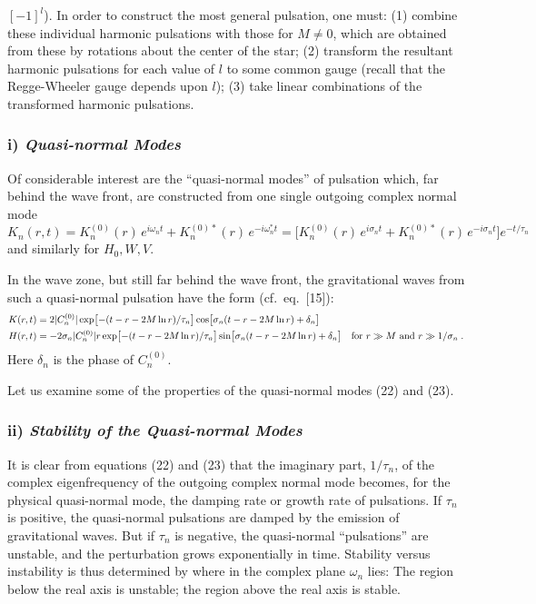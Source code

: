$[-1]^l$). In order to construct the most general pulsation, one must: (1) combine these
individual harmonic pulsations with those for $M \neq 0$, which are obtained from these by
rotations about the center of the star; (2) transform the resultant harmonic pulsations
for each value of $l$ to some common gauge (recall that the Regge-Wheeler gauge depends
upon $l$); (3) take linear combinations of the transformed harmonic pulsations.

\subsubsection*{i) \textit{Quasi-normal Modes}}

Of considerable interest are the ``quasi-normal modes'' of pulsation which, far behind
the wave front, are constructed from one single outgoing complex normal mode
\begin{equation}
  K_n(r,t) = K_n^{(0)}(r)\, e^{i\omega_n t} + K_n^{(0)*}(r)\, e^{-i\omega_n^* t}
  = \bigl[ K_n^{(0)}(r)\, e^{i\sigma_n t} + K_n^{(0)*}(r)\, e^{-i\sigma_n t} \bigr] e^{-t/\tau_n}
\label{eq:22}
\end{equation}
and similarly for $H_0, W, V$.

In the wave zone, but still far behind the wave front, the gravitational waves from such
a quasi-normal pulsation have the form (cf.\ eq.\ [15]):
\begin{align}
  K(r,t) &= 2 |C_n^{(0)}| \exp\bigl[-(t - r - 2M\ln r)/\tau_n\bigr]
             \cos\bigl[\sigma_n(t - r - 2M\ln r) + \delta_n\bigr] \notag \\
  H(r,t) &= -2\sigma_n |C_n^{(0)}| r \exp\bigl[-(t - r - 2M\ln r)/\tau_n\bigr]
             \sin\bigl[\sigma_n(t - r - 2M\ln r) + \delta_n\bigr]
             \quad \text{for } r \gg M \text{ and } r \gg 1/\sigma_n \;.
\label{eq:23}
\end{align}
Here $\delta_n$ is the phase of $C_n^{(0)}$.

Let us examine some of the properties of the quasi-normal modes (22) and (23).

\subsubsection*{ii) \textit{Stability of the Quasi-normal Modes}}

It is clear from equations (22) and (23) that the imaginary part, $1/\tau_n$, of the complex
eigenfrequency of the outgoing complex normal mode becomes, for the physical
quasi-normal mode, the damping rate or growth rate of pulsations. If $\tau_n$ is positive, the
quasi-normal pulsations are damped by the emission of gravitational waves. But if $\tau_n$
is negative, the quasi-normal ``pulsations'' are unstable, and the perturbation grows
exponentially in time. Stability versus instability is thus determined by where in the
complex plane $\omega_n$ lies: The region below the real axis is unstable; the region above the
real axis is stable.


